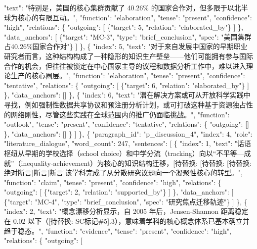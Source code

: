 \documentclass[12pt,a4paper]{article}
\begin{document}
          "text": "特别是，美国的核心集群贡献了 40.26\% 的国家合作对，但多限于以北半球为核心的有限互动。",
          "function": "elaboration",
          "tense": "present",
          "confidence": "high",
          "relations": \{
            "outgoing": [
              \{"target": 5, "relation": "elaborated\_by"\}
            ]
          \},
          "data\_anchors": [
            \{"target": "MC-3", "type": "brief\_conclusion", "spec": "美国集群占40.26\%国家合作对"\}
          ]
        \},
        \{
          "index": 5,
          "text": "对于来自发展中国家的早期职业研究者而言，这种结构构成了一种隐形的知识生产壁垒——他们可能拥有参与国际合作的机会，但往往被锁定在中心国家主导的议程和数据分析工作中，难以进入理论生产的核心圈层。",
          "function": "elaboration",
          "tense": "present",
          "confidence": "tentative",
          "relations": \{
            "outgoing": [
              \{"target": 6, "relation": "elaborated\_by"\}
            ]
          \},
          "data\_anchors": []
        \},
        \{
          "index": 6,
          "text": "潜在解决方案或可从开放科学实践中寻找，例如强制性数据共享协议和预注册分析计划，或可打破这种基于资源独占性的网络刚性，尽管这些实践在全球范围内的推广仍面临挑战。",
          "function": "outlook",
          "tense": "present",
          "confidence": "tentative",
          "relations": \{
            "outgoing": []
          \},
          "data\_anchors": []
        \}
      ]
    \},
    \{
      "paragraph\_id": "p\_discussion\_4",
      "index": 4,
      "role": "literature\_dialogue",
      "word\_count": 247,
      "sentences": [
        \{
          "index": 1,
          "text": "话语枢纽从早期的学校选择（school choice）和中学分流（tracking）向以“不平等—成就”（inequality-achievement）为核心的知识结构迁移，[待替换: [待替换: [待替换: 绝对断言]断言]断言]该学科完成了从分散研究议题向一个凝聚性核心的转型。",
          "function": "claim",
          "tense": "present",
          "confidence": "high",
          "relations": \{
            "outgoing": [
              \{"target": 2, "relation": "supported\_by"\}
            ]
          \},
          "data\_anchors": [
            \{"target": "MC-4", "type": "brief\_conclusion", "spec": "研究焦点迁移轨迹"\}
          ]
        \},
        \{
          "index": 2,
          "text": "概念漂移分析显示，自 2005 年后，Jensen-Shannon 距离稳定在 0.02 以下（[待替换: SC标记\#5].3），意味着学科的核心概念体系已基本确立并趋于稳态。",
          "function": "evidence",
          "tense": "present",
          "confidence": "high",
          "relations": \{
            "outgoing": [
\end{document}
